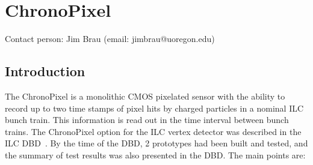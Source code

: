 \section{ChronoPixel}
Contact person: Jim Brau (email: jimbrau@uoregon.edu)
\subsection{Introduction}
The ChronoPixel is a monolithic CMOS pixelated sensor with the ability to record up to two time stamps of pixel hits by charged particles in a nominal ILC bunch train. This information is read out in the time interval between bunch trains. The ChronoPixel option for the ILC vertex detector was described in the ILC DBD~\cite{2011arXiv1109.2811B}. By the time of the DBD, 2 prototypes had been built and tested, and the summary of test results was also presented in the DBD. The main points are:
